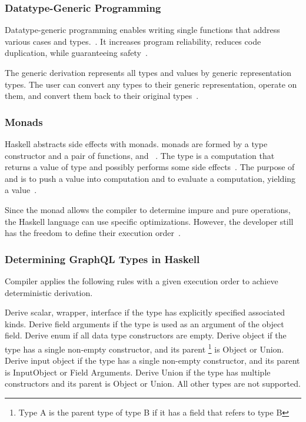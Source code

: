 \begin{frame}\frametitle{Datatype-Generic Programming}
    
  Datatype-generic programming enables writing single functions that address various cases and types.~\cite{derivable-type-classes}. 
  It increases program reliability, reduces code duplication, while guaranteeing safety~\cite{datatype-generic-programming,optimizing-generics}.
  
      
  The generic derivation represents all types and values by generic representation types. The user can convert any types to their generic representation, operate on them, and convert them back to their original types~\cite{optimizing-generics, ghc-generics}.
  
  \end{frame}

\begin{frame}\frametitle{Monads}

Haskell abstracts side effects with monads. monads are formed by a type constructor  and a pair of functions,  and \expr{>>=}~\cite{history-of-haskell,essence-of-fp}. The type  is a computation that returns a value of type  and possibly performs some side effects~\cite{history-of-haskell}. The purpose of  and \expr{>>=} is to push a value into computation and to evaluate a computation, yielding a value~\cite{essence-of-fp}.

Since the monad allows the compiler to determine impure and pure operations, the Haskell language can use specific optimizations. However, the developer still has the freedom to define their execution order~\cite{history-of-haskell}.

\end{frame}

\begin{frame}\frametitle{Determining GraphQL Types in Haskell}
Compiler applies the following rules with a given execution order to achieve deterministic derivation.
\begin{enumerate}
   Derive scalar, wrapper, interface if the type has explicitly specified associated kinds. 
   Derive field arguments if the type is used as an argument of the object field. 
   Derive enum if all data type constructors are empty.
   Derive object if the type has a single non-empty constructor, and its parent \footnote{Type A is the parent type of type B if it has a field that refers to type B} is Object or Union. 
   Derive input object if the type has a single non-empty constructor, and its parent is InputObject or Field Arguments.
   Derive Union if the type has multiple constructors and its parent is Object or Union.
   All other types are not supported.
\end{enumerate}
\end{frame}
